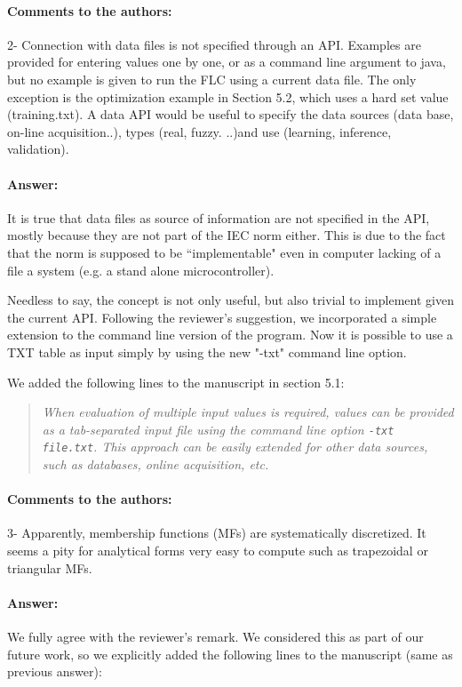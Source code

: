 \documentclass[10pt,a4paper]{article}
\begin{document}
\paragraph{Comments to the authors:} 2- Connection with data files is not specified through an API. Examples are provided for entering values one by one, or as a command line argument to java, but no example is given to run the FLC using a current data file. The only exception is the optimization example in Section 5.2, which uses a hard set value (training.txt). A data API would be useful to specify the data sources (data base, on-line acquisition..), types (real, fuzzy. ..)and use (learning, inference, validation).


\paragraph{Answer:} It is true that data files as source of information are not specified in the API, mostly because they are not part of the IEC norm either. 
This is due to the fact that the norm is supposed to be ``implementable" even in computer lacking of a file a system (e.g. a stand alone microcontroller).

Needless to say, the concept is not only useful, but also trivial to implement given the current API.
Following the reviewer's suggestion, we incorporated a simple extension to the command line version of the program.
Now it is possible to use a TXT table as input simply by using the new "-txt" command line option.

We added the following lines to the manuscript in section 5.1:
\begin{quotation}\textit{
When evaluation of multiple input values is required, values can be provided as a tab-separated input file using the command line option \texttt{-txt file.txt}.
This approach can be easily extended for other data sources, such as databases, online acquisition, etc.
}\end{quotation}


\paragraph{Comments to the authors:} 3- Apparently, membership functions (MFs) are systematically discretized. It seems a pity for analytical forms very easy to compute such as trapezoidal or triangular MFs. 

\paragraph{Answer:} We fully agree with the reviewer's remark. We considered this as part of our future work, so we explicitly added the following lines to the manuscript (same as previous answer):
\end{document}

